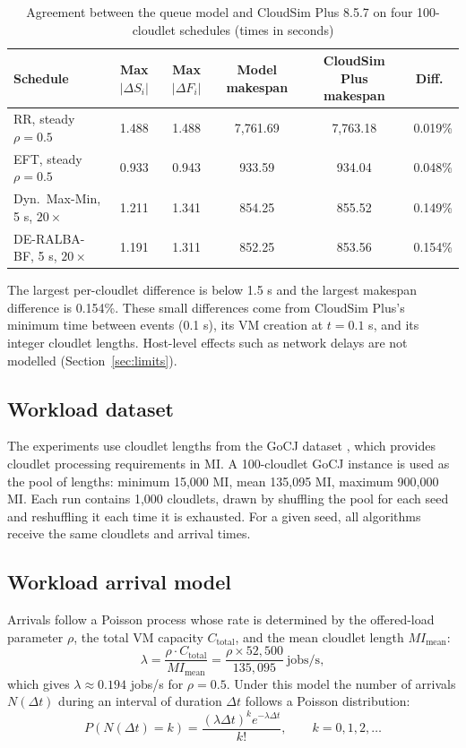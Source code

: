 \documentclass[default,sn-mathphys,Numbered]{sn-jnl}
\begin{document}
\begin{table}[h]
\caption{Agreement between the queue model and CloudSim Plus 8.5.7 on four 100-cloudlet schedules (times in seconds)}\label{tab:valid}
\centering
\scriptsize
\setlength{\tabcolsep}{3pt}
\begin{tabular}{lccccc}
\toprule
Schedule & Max $|\Delta S_i|$ & Max $|\Delta F_i|$ & Model makespan & CloudSim Plus makespan & Diff.\ \\
\midrule
RR, steady $\rho=0.5$ & 1.488 & 1.488 & 7,761.69 & 7,763.18 & 0.019\% \\
EFT, steady $\rho=0.5$ & 0.933 & 0.943 & 933.59 & 934.04 & 0.048\% \\
Dyn.\ Max-Min, 5 s, $20\times$ & 1.211 & 1.341 & 854.25 & 855.52 & 0.149\% \\
DE-RALBA-BF, 5 s, $20\times$ & 1.191 & 1.311 & 852.25 & 853.56 & 0.154\% \\
\bottomrule
\end{tabular}
\end{table}

The largest per-cloudlet difference is below 1.5 s and the largest makespan difference is 0.154\%. These small differences come from CloudSim Plus's minimum time between events (0.1 s), its VM creation at $t = 0.1$ s, and its integer cloudlet lengths. Host-level effects such as network delays are not modelled (Section~\ref{sec:limits}).

\subsection{Workload dataset}
The experiments use cloudlet lengths from the GoCJ dataset \cite{hussain2018gocj, hussain2018gocjdata}, which provides cloudlet processing requirements in MI. A 100-cloudlet GoCJ instance is used as the pool of lengths: minimum 15,000 MI, mean 135,095 MI, maximum 900,000 MI. Each run contains 1,000 cloudlets, drawn by shuffling the pool for each seed and reshuffling it each time it is exhausted. For a given seed, all algorithms receive the same cloudlets and arrival times.

\subsection{Workload arrival model}
Arrivals follow a Poisson process whose rate is determined by the offered-load parameter $\rho$, the total VM capacity $C_{\text{total}}$, and the mean cloudlet length $\mathit{MI}_{\text{mean}}$:
\begin{equation}\label{eq:lambda}
\lambda = \frac{\rho \cdot C_{\text{total}}}{\mathit{MI}_{\text{mean}}} = \frac{\rho \times 52{,}500}{135{,}095}\ \text{jobs/s},
\end{equation}
which gives $\lambda \approx 0.194$ jobs/s for $\rho = 0.5$. Under this model the number of arrivals $N(\Delta t)$ during an interval of duration $\Delta t$ follows a Poisson distribution:
\begin{equation}\label{eq:poisson}
P\left(N(\Delta t) = k\right) = \frac{(\lambda \Delta t)^k e^{-\lambda \Delta t}}{k!}, \qquad k = 0, 1, 2, \dots
\end{equation}
\end{document}
